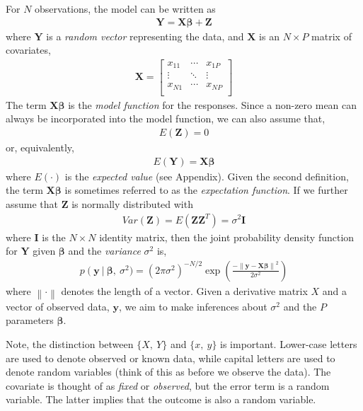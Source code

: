 \documentclass[11pt,a4paper]{article}
\begin{document}
For \(N\) observations, the model can be written as
\begin{align}
\boldsymbol{Y} = \boldsymbol{X\beta} + \boldsymbol{Z}
\end{align}
where \(\boldsymbol{Y}\) is a \emph{random vector} representing the data,
and \(\boldsymbol{X}\) is an \(N \times P\) matrix of covariates,
\begin{align}
\boldsymbol{X} = 
\begin{bmatrix}
x_{11} & \cdots & x_{1P} \\
 \vdots & \ddots & \vdots \\
x_{N1} & \cdots & x_{NP} \\
\end{bmatrix}
\end{align}
The term \(\boldsymbol{X\beta}\) is the \emph{model function} for the
responses. Since a non-zero mean can always be incorporated into the
model function, we can also assume that,
\begin{align}
E\left( \boldsymbol{Z} \right) = 0
\end{align}
or, equivalently,
\begin{align}
E\left( \boldsymbol{Y} \right) = \boldsymbol{X\beta}
\end{align}
where \(E( \cdot )\) is the \emph{expected value} (see Appendix). Given
the second definition, the term \(\boldsymbol{X\beta}\) is sometimes
referred to as the \emph{expectation function}. If we further assume
that \(\boldsymbol{Z}\) is normally distributed with
\begin{align}
Var\left( \boldsymbol{Z} \right) = E\left( \boldsymbol{Z}\boldsymbol{Z}^{T} \right) = \sigma^{2}\boldsymbol{I}
\end{align}
where \(\boldsymbol{I}\) is the \(N \times N\) identity matrix, then the
joint probability density function for \(\boldsymbol{Y}\) given
\(\boldsymbol{\beta}\) and the \emph{variance} \(\sigma^{2}\) is,
\begin{align}
p\left( \boldsymbol{y\ } \right|\ \boldsymbol{\beta},\ \sigma^{2}) = \left( 2\pi\sigma^{2} \right)^{- N/2}\exp\left( \frac{- \left\| \boldsymbol{y} - \boldsymbol{X\beta} \right\|^{2}}{2\sigma^{2}} \right)
\end{align}
where \(\left\| \cdot \right\|\) denotes the length of a vector. Given a
derivative matrix \(X\) and a vector of observed data, \(\boldsymbol{y}\),
we aim to make inferences about \(\sigma^{2}\) and the \(P\) parameters
\(\boldsymbol{\beta}\).

Note, the distinction between \(\{ X,\ Y\}\) and \(\{ x,\ y\}\) is
important. Lower-case letters are used to denote observed or known data,
while capital letters are used to denote random variables (think of this
as before we observe the data). The covariate is thought of as
\emph{fixed} or \emph{observed}, but the error term is a random
variable. The latter implies that the outcome is also a random variable.
\end{document}
